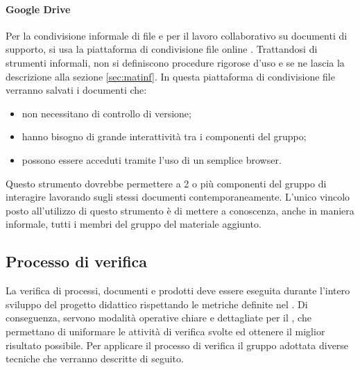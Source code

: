 \documentclass[12pt,a4paper]{article}
\begin{document}
\paragraph{Google Drive}
Per la condivisione informale di file e per il lavoro collaborativo su documenti di supporto, si usa la piattaforma di condivisione file online . Trattandosi di strumenti informali, non si definiscono procedure rigorose d’uso e se ne lascia la descrizione alla sezione \ref{sec:matinf}. In questa piattaforma di condivisione file verranno salvati i documenti che:
\begin{itemize}
	\item non necessitano di controllo di versione;
	\item hanno bisogno di grande interattività tra i componenti del gruppo;
	\item possono essere acceduti tramite l’uso di un semplice browser.
\end{itemize}

Questo strumento dovrebbe permettere a 2 o più componenti del gruppo di interagire lavorando sugli stessi documenti contemporaneamente.
L'unico vincolo posto all'utilizzo di questo strumento è di mettere a conoscenza, anche in maniera informale, tutti i membri del gruppo del materiale aggiunto.


\subsection{Processo di verifica}

La verifica di processi, documenti e prodotti deve essere eseguita durante l'intero sviluppo del progetto didattico rispettando le metriche definite nel \PdQ{}. Di conseguenza, servono modalità operative chiare e dettagliate per il \VR, che permettano di uniformare le attività di verifica svolte ed ottenere il miglior risultato possibile. Per applicare il processo di verifica il gruppo adottata diverse tecniche che verranno descritte di seguito.
\end{document}
